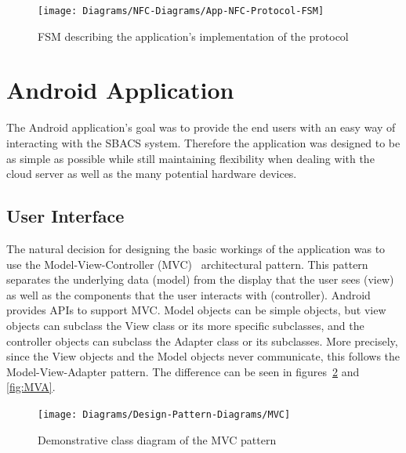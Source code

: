 \documentclass[12pt]{report}
\let\Oldsection\section
\renewcommand{\section}{\FloatBarrier\Oldsection}
\let\Oldsubsection\subsection
\renewcommand{\subsection}{\FloatBarrier\Oldsubsection}
\begin{document}
\begin{figure}
    \texttt{[image: Diagrams/NFC-Diagrams/App-NFC-Protocol-FSM]}
    \caption{FSM describing the application's implementation of the protocol}
    \label{fig:nfc-protocol-fsm-app}
\end{figure}


\section{Android Application} \label{android-application}

The Android application's goal was to provide the end users with an easy way of interacting with the SBACS system.
Therefore the application was designed to be as simple as possible while still maintaining flexibility when dealing with
the cloud server as well as the many potential hardware devices.


\subsection{User Interface} \label{user-interface}

The natural decision for designing the basic workings of the application was to use the Model-View-Controller (MVC)~\autocite{MVC} 
architectural pattern. This pattern separates the underlying data (model) from the display that the user sees (view) as well as
the components that the user interacts with (controller). Android provides APIs to support MVC. Model objects can be
simple objects, but view objects can subclass the View class or its more specific subclasses, and the controller
objects can subclass the Adapter class or its subclasses. More precisely, since the View objects and the Model objects
never communicate, this follows the Model-View-Adapter pattern. The difference can be seen in figures~\ref{fig:MVC} and
\ref{fig:MVA}.


\begin{figure}
    \centering
    \texttt{[image: Diagrams/Design-Pattern-Diagrams/MVC]}
    \caption{Demonstrative class diagram of the MVC pattern}
    \label{fig:MVC}
\end{figure}
\end{document}
